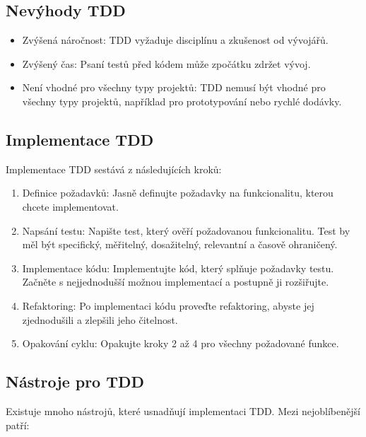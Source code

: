 \documentclass{article}
\begin{document}
\begin{Test Driven Development}
        \subsection{Nevýhody TDD}\label{subsec:nevyhody-tdd}

        \begin{itemize}
            \item Zvýšená náročnost: TDD vyžaduje disciplínu a zkušenost od vývojářů.
            \item Zvýšený čas: Psaní testů před kódem může zpočátku zdržet vývoj.
            \item Není vhodné pro všechny typy projektů: TDD nemusí být vhodné pro všechny typy projektů, například pro prototypování nebo rychlé dodávky.
        \end{itemize}

        \subsection{Implementace TDD}\label{subsec:implementace-tdd}

        Implementace TDD sestává z následujících kroků:

        \begin{enumerate}
            \item Definice požadavků: Jasně definujte požadavky na funkcionalitu, kterou chcete implementovat.
            \item Napsání testu: Napište test, který ověří požadovanou funkcionalitu.
            Test by měl být specifický, měřitelný, dosažitelný, relevantní a časově ohraničený.
            \item Implementace kódu: Implementujte kód, který splňuje požadavky testu.
            Začněte s nejjednodušší možnou implementací a postupně ji rozšiřujte.
            \item Refaktoring: Po implementaci kódu proveďte refaktoring, abyste jej zjednodušili a zlepšili jeho čitelnost.
            \item Opakování cyklu: Opakujte kroky 2 až 4 pro všechny požadované funkce.
        \end{enumerate}

        \subsection{Nástroje pro TDD}\label{subsec:nastroje-pro-tdd}

        Existuje mnoho nástrojů, které usnadňují implementaci TDD. Mezi nejoblíbenější patří:


\end{Test Driven Development}
\end{document}
